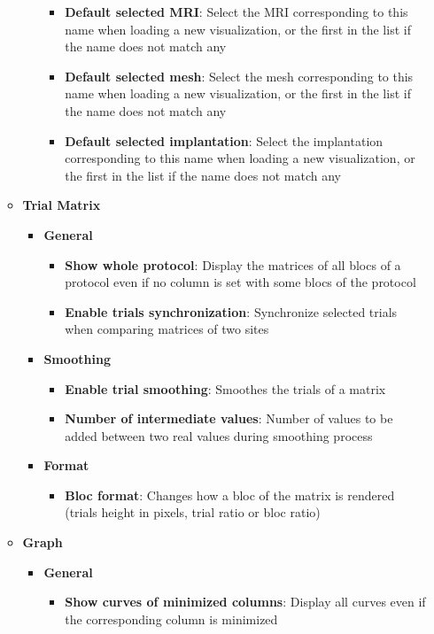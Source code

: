 \documentclass[a4paper]{article}
\begin{document}
\begin{itemize}
\begin{itemize}
\begin{itemize}
\begin{itemize}
\item \textbf{Default selected MRI}: Select the MRI corresponding to this name when loading a new visualization, or the first in the list if the name does not match any
\item \textbf{Default selected mesh}: Select the mesh corresponding to this name when loading a new visualization, or the first in the list if the name does not match any
\item \textbf{Default selected implantation}: Select the implantation corresponding to this name when loading a new visualization, or the first in the list if the name does not match any
\end{itemize}
\end{itemize}
\item \textbf{Trial Matrix}
\begin{itemize}
\item \textbf{General}
\begin{itemize}
\item \textbf{Show whole protocol}: Display the matrices of all blocs of a protocol even if no column is set with some blocs of the protocol
\item \textbf{Enable trials synchronization}: Synchronize selected trials when comparing matrices of two sites
\end{itemize}
\item \textbf{Smoothing}
\begin{itemize}
\item \textbf{Enable trial smoothing}: Smoothes the trials of a matrix
\item \textbf{Number of intermediate values}: Number of values to be added between two real values during smoothing process
\end{itemize}
\item \textbf{Format}
\begin{itemize}
\item \textbf{Bloc format}: Changes how a bloc of the matrix is rendered (trials height in pixels, trial ratio or bloc ratio)
\end{itemize}
\end{itemize}
\item \textbf{Graph}
\begin{itemize}
\item \textbf{General}
\begin{itemize}
\item \textbf{Show curves of minimized columns}: Display all curves even if the corresponding column is minimized

\end{itemize}
\end{itemize}
\end{itemize}
\end{itemize}
\end{document}
